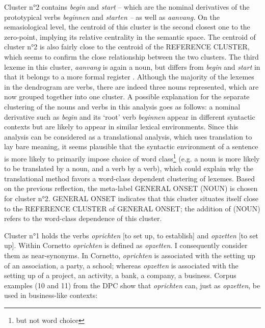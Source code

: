 Cluster n°2 contains \textit{begin} and \textit{start} – which are the nominal derivatives of the prototypical verbs \textit{beginnen} and \textit{starten} \textit{–} as well as \textit{aanvang.} On the semasiological level, the centroid of this cluster is the second closest one to the zero-point, implying its relative centrality in the semantic space. The centroid of cluster n°2 is also fairly close to the centroid of the REFERENCE CLUSTER, which seems to confirm the close relationship between the two clusters. The third lexeme in this cluster, \textit{aanvang} is again a noun, but differs from \textit{begin} and \textit{start} in that it belongs to a more formal register \citep{van_dale_van_2015}. Although the majority of the lexemes in the dendrogram are verbs, there are indeed three nouns represented, which are now grouped together into one cluster. A possible explanation for the separate clustering of the nouns and verbs in this analysis goes as follows: a nominal derivative such as \textit{begin} and its ‘root’ verb \textit{beginnen} appear in different syntactic contexts but are likely to appear in similar lexical environments. Since this analysis can be considered as a translational analysis, which uses translation to lay bare meaning, it seems plausible that the syntactic environment of a sentence is more likely to primarily impose choice of word class\footnote{but not word choice} (e.g. a noun is more likely to be translated by a noun, and a verb by a verb), which could explain why the translational method favors a word-class dependent clustering of lexemes. Based on the previous reflection, the meta-label GENERAL ONSET (NOUN) is chosen for cluster n°2. GENERAL ONSET indicates that this cluster situates itself close to the REFERENCE CLUSTER of GENERAL ONSET; the addition of (NOUN) refers to the word-class dependence of this cluster.

Cluster n°1 holds the verbs \textit{oprichten} [to set up, to establish] and \textit{opzetten} [to set up]. Within Cornetto \textit{oprichten} is defined as \textit{opzetten}. I consequently consider them as near-synonyms. In Cornetto, \textit{oprichten} is associated with the setting up of an association, a party, a school; whereas \textit{opzetten} is associated with the setting up of a project, an activity, a bank, a company, a business. Corpus examples (10 and 11) from the DPC show that \textit{oprichten} can, just as \textit{opzetten}, be used in business-like contexts:

